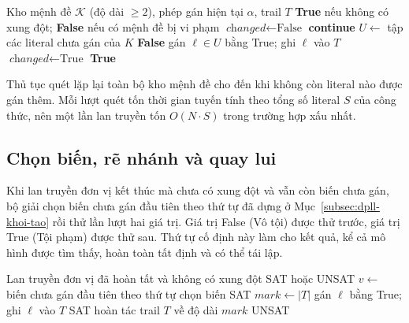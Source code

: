 \begin{algorithm}[H]
\caption{Lan truyền đơn vị \textsc{UnitPropagate}}
\label{alg:unit-propagate}
\begin{algorithmic}[1]
\REQUIRE Kho mệnh đề $\mathcal{K}$ (độ dài $\ge 2$), phép gán hiện tại $\alpha$, trail $T$
\ENSURE \textbf{True} nếu không có xung đột; \textbf{False} nếu có mệnh đề bị vi phạm
\REPEAT
    \STATE $\textit{changed} \leftarrow \text{False}$
            \STATE \textbf{continue}
        \ENDIF
        \STATE $U \leftarrow$ tập các literal chưa gán của $K$
            \RETURN \textbf{False} 
            \STATE gán $\ell \in U$ bằng True; ghi $\ell$ vào $T$
            \STATE $\textit{changed} \leftarrow \text{True}$
        \ENDIF
    \ENDFOR
{}
\RETURN \textbf{True}
\end{algorithmic}
\end{algorithm}

Thủ tục quét lặp lại toàn bộ kho mệnh đề cho đến khi không còn literal nào được gán thêm. Mỗi lượt quét tốn thời gian tuyến tính theo tổng số literal $S$ của công thức, nên một lần lan truyền tốn $O(N \cdot S)$ trong trường hợp xấu nhất.

\subsection{Chọn biến, rẽ nhánh và quay lui}
\label{subsec:dpll-re-nhanh}

Khi lan truyền đơn vị kết thúc mà chưa có xung đột và vẫn còn biến chưa gán, bộ giải chọn biến chưa gán đầu tiên theo thứ tự đã dựng ở Mục~\ref{subsec:dpll-khoi-tao} rồi thử lần lượt hai giá trị. Giá trị False (Vô tội) được thử trước, giá trị True (Tội phạm) được thử sau. Thứ tự cố định này làm cho kết quả, kể cả mô hình được tìm thấy, hoàn toàn tất định và có thể tái lập.

\begin{algorithm}[H]
\caption{Thủ tục đệ quy \textsc{DPLL}}
\label{alg:dpll}
\begin{algorithmic}[1]
\REQUIRE Lan truyền đơn vị đã hoàn tất và không có xung đột
\ENSURE SAT hoặc UNSAT
\STATE $v \leftarrow$ biến chưa gán đầu tiên theo thứ tự chọn biến
    \RETURN SAT 
\ENDIF
\STATE $\textit{mark} \leftarrow |T|$ 
    \STATE gán $\ell$ bằng True; ghi $\ell$ vào $T$
            \RETURN SAT 
        \ENDIF
    \ENDIF
    \STATE hoàn tác trail $T$ về độ dài $\textit{mark}$ 
\ENDFOR
\RETURN UNSAT 
\end{algorithmic}
\end{algorithm}


